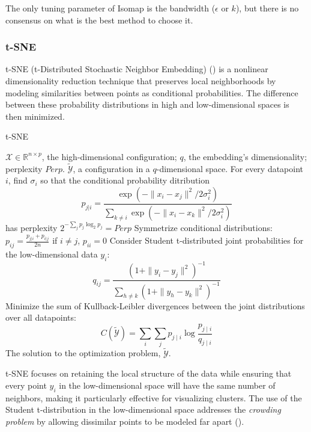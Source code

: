 The only tuning parameter of Isomap is the bandwidth ($\epsilon$ or $k$), but there is no consensus on what is the best method to choose it.

\subsubsection{t-SNE}

t-SNE (t-Distributed Stochastic Neighbor Embedding) (\cite{Vandermaaten2008}) is a nonlinear dimensionality reduction technique that preserves local neighborhoods by modeling similarities between points as conditional probabilities. The difference between these probability distributions in high and low-dimensional spaces is then minimized.

\begin{algorithm}
    \caption{t-SNE}
    \label{alg:tSNE}
    
    \begin{algorithmic}[1]
    \REQUIRE $\mathcal{X} \in \mathbb{R}^{n \times p}$, the high-dimensional configuration; $q$, the embedding's dimensionality; perplexity $Perp$.
    \ENSURE $\tilde{\mathcal{Y}}$, a configuration in a $q$-dimensional space.
    \STATE For every datapoint $i$, find $\sigma_i$ so that the conditional probability ditribution
        $$p_{j|i} = \frac{\exp(-\|x_i-x_j\|^2/2\sigma_i^2)}{\sum_{k \neq i}\exp(-\|x_i-x_k\|^2/2\sigma_i^2)}$$ has perplexity $2^{-\sum_{j}p_j \log_2 p_j} = Perp$
    \STATE Symmetrize conditional distributions: $p_{ij} = \frac{p_{j|i} + p_{i|j}}{2n}$ if $i\neq j$, $p_{ii} = 0$
    \STATE Consider Student t-distributed joint probabilities for the low-dimensional data $y_i$: $$q_{ij} = \frac{(1 + \|y_i-y_j\|^2)^{-1}}{\sum_{h \neq k}(1 + \|y_h-y_k\|^2)^{-1}}$$
    \STATE Minimize the sum of Kullback-Leibler divergences between the joint distributions over all datapoints: $$C(\tilde{\mathcal{Y}})=\sum_i \sum_j p_{j \mid i} \log \frac{p_{j \mid i}}{q_{j \mid i}}$$
    \RETURN The solution to the optimization problem, $\tilde{\mathcal{Y}}$.
    
    \end{algorithmic}
\end{algorithm}

t-SNE focuses on retaining the local structure of the data while ensuring that every point $y_i$ in the low-dimensional space will have the same number of neighbors, making it particularly effective for visualizing clusters. The use of the Student t-distribution in the low-dimensional space addresses the \textit{crowding problem} by allowing dissimilar points to be modeled far apart (\cite{Vandermaaten2008}).

